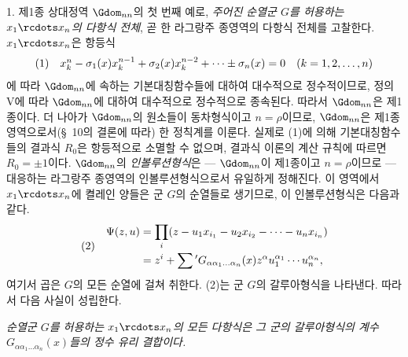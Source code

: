 
1. 제1종 상대정역 $\Gdom_{nn}$의 첫 번째 예로, \emph{주어진 순열군 $G$를 허용하는 $x_1\rcdots x_n$의 다항식 전체}, 곧 한 라그랑주 종영역의 다항식 전체를 고찰한다. $x_1\rcdots x_n$은 항등식
\[
\begin{array}{@{}l@{\quad}c@{}}
(1)& x_k^n-\sigma_1(x)x_k^{n-1}+\sigma_2(x)x_k^{n-2}+\cdots\pm\sigma_n(x)=0\quad(k=1,2,\ldots,n)
\end{array}
\]
에 따라 $\Gdom_{nn}$에 속하는 기본대칭함수들에 대하여 대수적으로 정수적이므로, 정의 V에 따라 $\Gdom_{nn}$에 대하여 대수적으로 정수적으로 종속된다. 따라서 $\Gdom_{nn}$은 제1종이다. 더 나아가 $\Gdom_{nn}$의 원소들이 동차형식이고 $n=\rho$이므로, $\Gdom_{nn}$은 제1종 영역으로서(\S\ 10의 결론에 따라) 한 정칙계를 이룬다. 실제로 (1)에 의해 기본대칭함수들의 결과식 $R_0$은 항등적으로 소멸할 수 없으며, 결과식 이론의 계산 규칙에 따르면 $R_0=\pm1$이다. $\Gdom_{nn}$의 \emph{인볼루션형식}은 --- $\Gdom_{nn}$이 제1종이고 $n=\rho$이므로 --- 대응하는 라그랑주 종영역의 인볼루션형식으로서 유일하게 정해진다. 이 영역에서 $x_1\rcdots x_n$에 켤레인 양들은 군 $G$의 순열들로 생기므로, 이 인볼루션형식은 다음과 같다.
\[
\begin{array}{@{}l@{\quad}c@{}}
(2)&
\begin{aligned}
  \Psi(z,u)&=\prod_i
  (z-u_1x_{i_1}-u_2x_{i_2}-\cdots-u_nx_{i_n})\\
  &=z^i+\sum{}'G_{\alpha\alpha_1\ldots\alpha_n}(x)
  z^\alpha u_1^{\alpha_1}\cdots u_n^{\alpha_n},
\end{aligned}
\end{array}
\]
여기서 곱은 $G$의 모든 순열에 걸쳐 취한다. (2)는 \glqq{}군 $G$의 갈루아형식\grqq{}을 나타낸다. 따라서 다음 사실이 성립한다.

\emph{순열군 $G$를 허용하는 $x_1\rcdots x_n$의 모든 다항식은 그 군의 갈루아형식의 계수 $G_{\alpha\alpha_1\ldots\alpha_n}(x)$들의 정수 유리 결합이다.}
